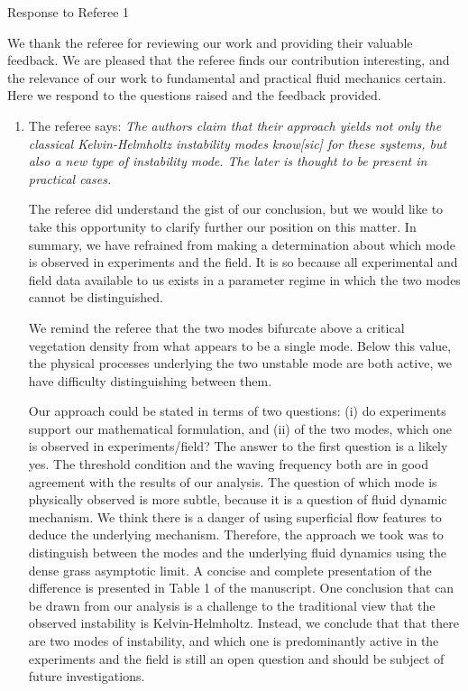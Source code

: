 \documentclass[letterpaper,10pt]{article}
\begin{document}
\centerline{Response to Referee 1}
We thank the referee for reviewing our work and providing their valuable feedback. 
We are pleased that the referee finds our contribution interesting, and the relevance of our work to fundamental and practical fluid mechanics certain.
Here we respond to the questions raised and the feedback provided.

\begin{enumerate}
\item The referee says:
\textit{
The authors claim that their approach yields not only the classical Kelvin-Helmholtz instability modes know[sic] for these systems, but also a new type of instability mode. The later is thought to be present in practical cases.
}

The referee did understand the gist of our conclusion, but we would like to take this opportunity to clarify further our position on this matter. In summary, we have refrained from making a determination about which mode is observed in experiments and the field. It is so because all experimental and field data available to us exists in a parameter regime in which the two modes cannot be distinguished. 

We remind the referee that the two modes bifurcate above a critical vegetation density from what appears to be a single mode. Below this value, the physical processes underlying the two unstable mode are both active, we have difficulty distinguishing between them. 

Our approach could be stated in terms of two questions: (i) do experiments support our mathematical formulation, and (ii) of the two modes, which one is observed in experiments/field? The answer to the first question is a likely yes. The threshold condition and the waving frequency both are in good agreement with the results of our analysis. The question of which mode is physically observed is more subtle, because it is a question of fluid dynamic mechanism. We think there is a danger of using superficial flow features to deduce the underlying mechanism. Therefore, the approach we took was to distinguish between the modes and the underlying fluid dynamics using the dense grass asymptotic limit. A concise and complete presentation of the difference is presented in Table 1 of the manuscript. One conclusion that can be drawn from our analysis is a challenge to the traditional view that the observed instability is Kelvin-Helmholtz. Instead, we conclude that that there are two modes of instability, and which one 
is predominantly active in the experiments and the field is still an open question and should be subject of future investigations. 


\end{enumerate}
\end{document}
